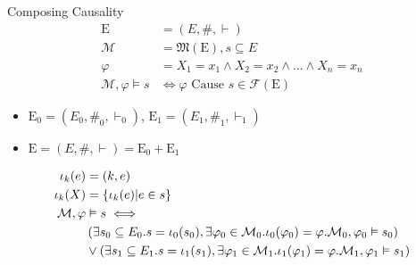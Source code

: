 \begin{frame}{Composing Causality}
    \begin{align*}
        \mathrm{E}                   & = (E,\#,\vdash)                          \\
        \mathcal{M}                  & = \mathfrak{M}(\mathrm{E}),s \subseteq E \\
        \varphi                      & = X_1 = x_1 \wedge X_2 = x_2
        \wedge ... \wedge X_n = x_n                                             \\
        \mathcal{M},\varphi \vDash s & \iff \varphi \text{ Cause }
        s \in \mathcal{F}(\mathrm{E})
    \end{align*}
    \begin{itemize}
        \item $\mathrm{E}_0 = (E_0,\#_0,\vdash_0)$, $\mathrm{E}_1 = (E_1,\#_1,\vdash_1)$
        \item $\mathrm{E} = (E,\#,\vdash) = \mathrm{E}_0 + \mathrm{E}_1$
    \end{itemize}
    \begin{align*}
        \iota_k(e)          & = (k,e)                     \\
        \iota_k(X)          & = \{\iota_{k}(e)| e \in s\} \\
        \mathcal{M},\varphi & \vDash s \iff               \\
                            & \left(
        \exists s_0 \subseteq E_0. s = \iota_0(s_0)
        ,\exists \varphi_0 \in \mathcal{M}_0. \iota_0(\varphi_0) = \varphi.
        \mathcal{M}_0,\varphi_0 \vDash s_0
        \right)                                           \\
                            & \vee \left(
        \exists s_1 \subseteq E_1. s = \iota_1(s_1)
        ,\exists \varphi_1 \in \mathcal{M}_1. \iota_1(\varphi_1) = \varphi.
        \mathcal{M}_1,\varphi_1 \vDash s_1
        \right)
    \end{align*}
\end{frame}